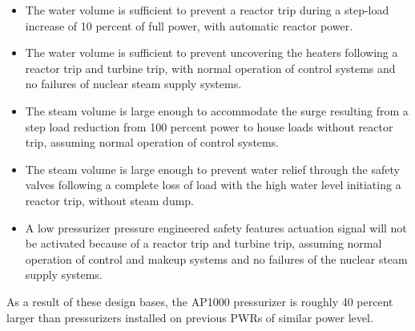 \begin{itemize}
\item The water volume is sufficient to prevent a reactor trip during a step-load increase of 10 percent of full power, with automatic reactor power.  
\item The water volume is sufficient to prevent uncovering the heaters following a reactor trip and turbine trip, with normal operation of control systems and no failures of nuclear steam supply systems.
\item The steam volume is large enough to accommodate the surge resulting from a step load reduction from 100 percent power to house loads without reactor trip, assuming normal operation of control systems. 
\item The steam volume is large enough to prevent water relief through the safety valves following a complete loss of load with the high water level initiating a reactor trip, without steam dump.
\item A low pressurizer pressure engineered safety features actuation signal will not be activated because of a reactor trip and turbine trip, assuming normal operation of control and makeup systems and no failures of the nuclear steam supply systems.
\end{itemize}
As a result of these design bases, the AP1000 pressurizer is roughly 40 percent larger than pressurizers installed on previous PWRs of similar power level. 

